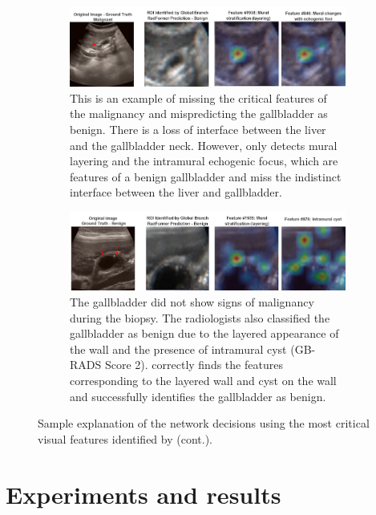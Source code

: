 \begin{figure}[t]\ContinuedFloat
    \centering
    \begin{subfigure}[b]{0.6\linewidth}
		\centering
		\includegraphics[width=\linewidth]{figs/radformer/demo_3.png}
		\caption{This is an example of \radformer missing the critical features of the malignancy and mispredicting the gallbladder as benign. There is a loss of interface between the liver and the gallbladder neck. However, \radformer only detects mural layering and the intramural echogenic focus, which are features of a benign gallbladder and miss the indistinct interface between the liver and gallbladder.}
	\end{subfigure}
	
	\begin{subfigure}[b]{0.6\textwidth}
		\centering
		\includegraphics[width=\linewidth]{figs/radformer/demo_4.png}
		\caption{The gallbladder did not show signs of malignancy during the biopsy. The radiologists also classified the gallbladder as benign due to the layered appearance of the wall and the presence of intramural cyst (GB-RADS Score 2). \radformer correctly finds the features corresponding to the layered wall and cyst on the wall and successfully identifies the gallbladder as benign.}
	\end{subfigure}
    \caption[]{Sample explanation of the network decisions using the most critical visual features identified by \radformer (cont.).}
    \label{fig:radform_expl_2}
\end{figure}



\section{Experiments and results}
%
